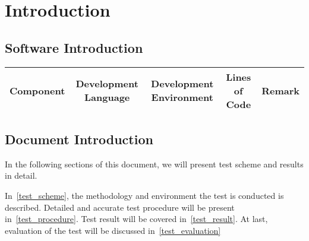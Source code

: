 
\section{Introduction}
\subsection{Software Introduction}
\begin{table}[!ht]
	\begin{tabular}{|c|c|c|c|c|}
		\hline
		Component & Development Language & Development Environment & Lines of Code & Remark \\\hline
	\end{tabular}
\end{table}

\subsection{Document Introduction}
	In the following sections of this document, we will present test scheme and
	results in detail.

	In~\ref{test_scheme}, the methodology and environment the test is conducted
	is described. Detailed and accurate test procedure will be present in~\ref{test_procedure}.
	Test result will be covered in~\ref{test_result}. At last, evaluation of the test
	will be discussed in~\ref{test_evaluation}

